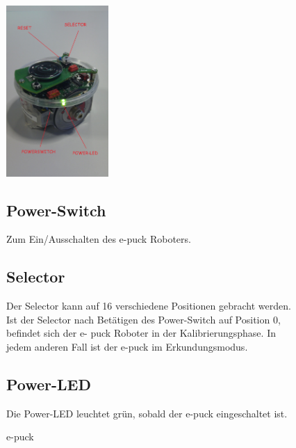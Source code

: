 \documentclass[10pt,a4paper]{article}
\begin{document}
 	\begin{figure}[htbp]
		\begin{minipage}[t]{6.5cm}
			\vspace{0pt}
			\includegraphics[height=6.5cm]{images/puck1klein} 
			\caption{e-puck}
		\end{minipage}
		\hfill
		\begin{minipage}[t]{0.5\textwidth}
			\vspace{5pt}
				\subsection{Power-Switch}
					Zum Ein/Ausschalten des e-puck Roboters.
				\subsection{Selector}
					Der Selector kann auf 16 verschiedene Positionen gebracht werden. Ist der Selector nach Bet\"atigen des Power-Switch auf Position 0, befindet sich der e-
					puck Roboter in der Kalibrierungsphase. In jedem anderen Fall ist der e-puck im Erkundungsmodus.
				\subsection{Power-LED}
					Die Power-LED leuchtet gr\"un, sobald der e-puck eingeschaltet ist.
		\end{minipage}
   \end{figure}
   
\end{document}
